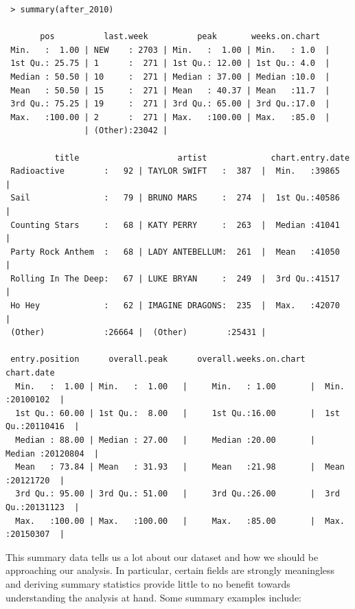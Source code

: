 \documentclass[11pt]{article} %
\begin{document}
\begin{verbatim}
 > summary(after_2010)

       pos          last.week          peak       weeks.on.chart
 Min.   :  1.00 | NEW    : 2703 | Min.   :  1.00 | Min.   : 1.0  |
 1st Qu.: 25.75 | 1      :  271 | 1st Qu.: 12.00 | 1st Qu.: 4.0  |
 Median : 50.50 | 10     :  271 | Median : 37.00 | Median :10.0  |
 Mean   : 50.50 | 15     :  271 | Mean   : 40.37 | Mean   :11.7  |
 3rd Qu.: 75.25 | 19     :  271 | 3rd Qu.: 65.00 | 3rd Qu.:17.0  |
 Max.   :100.00 | 2      :  271 | Max.   :100.00 | Max.   :85.0  |
                | (Other):23042 |                                
                  
          title                    artist             chart.entry.date     
 Radioactive        :   92 | TAYLOR SWIFT   :  387  |  Min.   :39865   |
 Sail               :   79 | BRUNO MARS     :  274  |  1st Qu.:40586   |
 Counting Stars     :   68 | KATY PERRY     :  263  |  Median :41041   |
 Party Rock Anthem  :   68 | LADY ANTEBELLUM:  261  |  Mean   :41050   |
 Rolling In The Deep:   67 | LUKE BRYAN     :  249  |  3rd Qu.:41517   |
 Ho Hey             :   62 | IMAGINE DRAGONS:  235  |  Max.   :42070   |
 (Other)            :26664 |  (Other)        :25431 |        
                            
 entry.position      overall.peak      overall.weeks.on.chart       chart.date      
  Min.   :  1.00 | Min.   :  1.00   |     Min.   : 1.00       |  Min.   :20100102  |  
  1st Qu.: 60.00 | 1st Qu.:  8.00   |     1st Qu.:16.00       |  1st Qu.:20110416  |
  Median : 88.00 | Median : 27.00   |     Median :20.00       |  Median :20120804  |
  Mean   : 73.84 | Mean   : 31.93   |     Mean   :21.98       |  Mean   :20121720  |
  3rd Qu.: 95.00 | 3rd Qu.: 51.00   |     3rd Qu.:26.00       |  3rd Qu.:20131123  |
  Max.   :100.00 | Max.   :100.00   |     Max.   :85.00       |  Max.   :20150307  |
\end{verbatim}

This summary data tells us a lot about our dataset and how we should be approaching our analysis. In particular, certain fields are strongly meaningless and deriving summary statistics provide little to no benefit towards understanding the analysis at hand. Some summary examples include:
\end{document}
